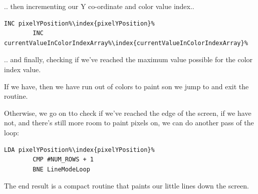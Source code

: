.. then incrementing our Y co-ordinate and color value index..
\begin{lstlisting}[escapechar=\%]
        INC pixelYPosition%\index{pixelYPosition}%
        INC currentValueInColorIndexArray%\index{currentValueInColorIndexArray}%
\end{lstlisting}
.. and finally, checking if we've reached the maximum value possible for the color index value. 

If we have, then we have run out of colors to paint son we jump to
 and exit the routine.

Otherwise, we go on tto check if we've reached the edge of the screen, if we have not, and there's still more room
to paint pixels on, we can do another pass of the loop:

\begin{lstlisting}[escapechar=\%]
        LDA pixelYPosition%\index{pixelYPosition}%
        CMP #NUM_ROWS + 1
        BNE LineModeLoop
\end{lstlisting}

The end result is a compact routine that paints our little lines down the screen. 

